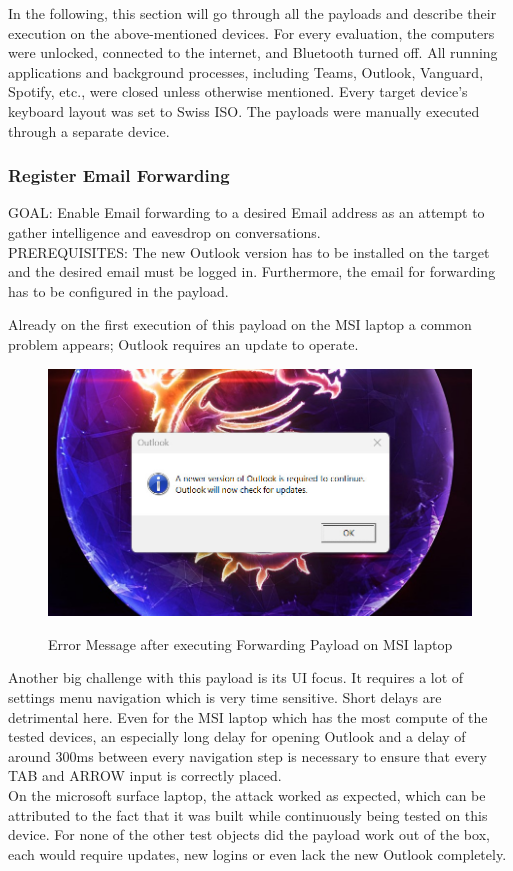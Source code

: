 In the following, this section will go through all the payloads and describe their execution on the above-mentioned devices. For every evaluation, the computers were unlocked, connected to the internet, and Bluetooth turned off. All running applications and background processes, including Teams, Outlook, Vanguard, Spotify, etc., were closed unless otherwise mentioned. Every target device's keyboard layout was set to Swiss ISO. The payloads were manually executed through a separate device. 

\subsubsection{Register Email Forwarding}

GOAL: Enable Email forwarding to a desired Email address as an attempt to gather intelligence and eavesdrop on conversations. \\
PREREQUISITES: The new Outlook version has to be installed on the target and the desired email must be logged in. Furthermore, the email for forwarding has to be configured in the payload. 

Already on the first execution of this payload on the MSI laptop a common problem appears; Outlook requires an update to operate. 

\begin{figure}[H]
    \centering
    \includegraphics[width=0.5\linewidth]{visuals/outlook_requires_update.jpeg}
    \caption{Error Message after executing Forwarding Payload on MSI laptop}
    \label{fig:builtInTeensy}
    \cite{farhiMalboardNovelUser2019}
\end{figure}


Another big challenge with this payload is its UI focus. It requires a lot of settings menu navigation which is very time sensitive. Short delays are detrimental here. Even for the MSI laptop which has the most compute of the tested devices, an especially long delay for opening Outlook and a delay of around 300ms between every navigation step is necessary to ensure that every TAB and ARROW input is correctly placed. \\
On the microsoft surface laptop, the attack worked as expected, which can be attributed to the fact that it was built while continuously being tested on this device. For none of the other test objects did the payload work out of the box, each would require updates, new logins or even lack the new Outlook completely. 

